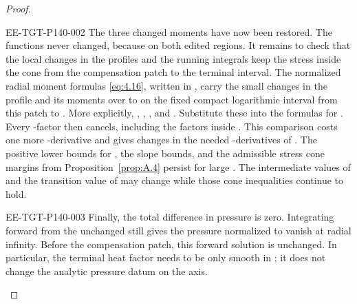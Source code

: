 \begin{proof}
\begin{EESegment}{EE-TGT-P140-002}
The three changed moments have now been restored. The functions  never changed, because
 on both edited regions. It remains to check that the local changes in the profiles and the
running integrals keep the stress inside the cone from the compensation patch to the terminal interval. The normalized
radial moment formulas \eqref{eq:4.16}, written in , carry the small changes in the profile
and its moments over to  on the fixed compact logarithmic interval from this patch to
. More explicitly,
,
,
, and
. Substitute these into the formulas for
. Every -factor then cancels, including the factors inside
. This comparison costs one more -derivative and gives
 changes in the needed -derivatives of
. The positive lower bounds for , the slope bounds, and the
admissible stress cone margins from Proposition~\ref{prop:A.4} persist for large . The
intermediate values of  and the transition value of
 may change while those cone inequalities continue to hold.
\end{EESegment}

\begin{EESegment}{EE-TGT-P140-003}
Finally, the total difference in pressure is zero. Integrating
 forward from the unchanged  still gives the
pressure normalized to vanish at radial infinity. Before the compensation patch, this forward solution is unchanged.
In particular, the terminal heat factor needs to be only smooth in ; it does not change the
analytic pressure datum on the axis.
\end{EESegment}
\end{proof}

